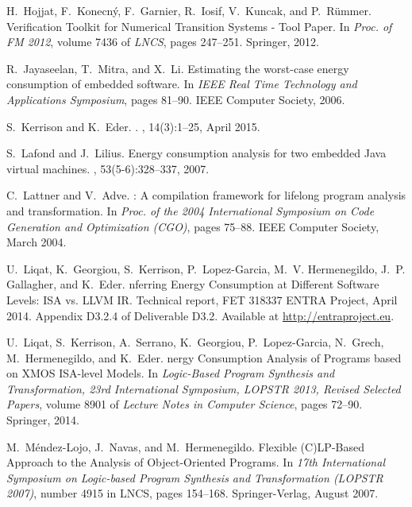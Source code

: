 \documentclass{llncs}
\begin{document}
\begin{thebibliography}{10}
H.~Hojjat, F.~Konecn{\'{y}}, F.~Garnier, R.~Iosif, V.~Kuncak, and
  P.~R{\"{u}}mmer.
 {V}erification {T}oolkit for {N}umerical {T}ransition {S}ystems -
  {T}ool {P}aper.
\newblock In {\em Proc. of FM 2012}, volume 7436 of {\em LNCS}, pages 247--251.
  Springer, 2012.

R.~Jayaseelan, T.~Mitra, and X.~Li.
\newblock Estimating the worst-case energy consumption of embedded software.
\newblock In {\em IEEE Real Time Technology and Applications Symposium}, pages
  81--90. IEEE Computer Society, 2006.

S.~Kerrison and K.~Eder.
.
, 14(3):1--25,
  April 2015.

S.~Lafond and J.~Lilius.
\newblock Energy consumption analysis for two embedded {J}ava virtual machines.
, 53(5-6):328--337, 2007.

C.~Lattner and V.~Adve.
: A compilation framework for lifelong program analysis and
  transformation.
\newblock In {\em Proc. of the 2004 International Symposium on Code Generation
  and Optimization (CGO)}, pages 75--88. IEEE Computer Society, March 2004.

U.~Liqat, K.~Georgiou, S.~Kerrison, P.~Lopez-Garcia, M.~V. Hermenegildo, J.~P.
  Gallagher, and K.~Eder.
nferring {E}nergy {C}onsumption at {D}ifferent {S}oftware
  {L}evels: {ISA} vs. {LLVM IR}.
\newblock Technical report, FET 318337 ENTRA Project, April 2014.
\newblock Appendix D3.2.4 of Deliverable D3.2. Available at
  \url{http://entraproject.eu}.

U.~Liqat, S.~Kerrison, A.~Serrano, K.~Georgiou, P.~Lopez-Garcia, N.~Grech,
  M.~Hermenegildo, and K.~Eder.
nergy {C}onsumption {A}nalysis of {P}rograms based on {XMOS}
  {ISA}-level {M}odels.
\newblock In {\em Logic-Based Program Synthesis and Transformation, 23rd
  International Symposium, {LOPSTR} 2013, Revised Selected Papers}, volume 8901
  of {\em Lecture Notes in Computer Science}, pages 72--90. Springer, 2014.

M.~M\'{e}ndez-Lojo, J.~Navas, and M.~Hermenegildo.
 {F}lexible ({C}){LP}-{B}ased {A}pproach to the {A}nalysis of
  {O}bject-{O}riented {P}rograms.
\newblock In {\em 17th International Symposium on Logic-based Program Synthesis
  and Transformation (LOPSTR 2007)}, number 4915 in LNCS, pages 154--168.
  Springer-Verlag, August 2007.


\end{thebibliography}
\end{document}
